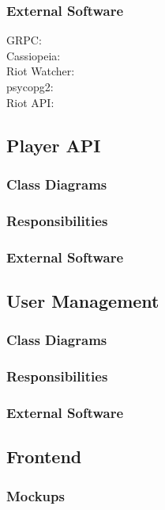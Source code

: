 \subsubsection{External Software}
GRPC: \href{https://grpc.io/docs/languages/python/basics/}\\
Cassiopeia: \href{https://github.com/meraki-analytics/cassiopeia}\\
Riot Watcher: \href{https://github.com/pseudonym117/Riot-Watcher}\\
psycopg2: \href{https://pypi.org/project/psycopg2/}\\
Riot API: \href{https://developer.riotgames.com/}\\

\subsection{Player API}
\subsubsection{Class Diagrams}
\subsubsection{Responsibilities}
\subsubsection{External Software}
\subsection{User Management}
\subsubsection{Class Diagrams}
\subsubsection{Responsibilities}
\subsubsection{External Software}

\newpage

\subsection{Frontend}

\subsubsection{Mockups}

